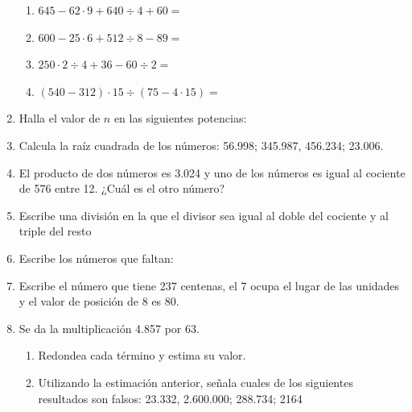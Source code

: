 \documentclass[twoside]{article}
\begin{document}
\begin{enumerate}
\begin{enumerate}
\item $645 - 62 \cdot 9 + 640 \div 4 + 60 =$
\item $600 - 25 \cdot 6 + 512 \div 8 - 89 =$
\item $250 \cdot 2 \div 4 + 36 - 60 \div 2 =$
\item $(540 - 312) \cdot 15 \div (75 - 4 \cdot 15)=$
\end{enumerate}
\item Halla el valor de $n$ en las siguientes potencias:
\begin{enumerate}
\end{enumerate}
\item Calcula la raíz cuadrada de los números: 56.998; 345.987, 456.234; 23.006.
\item El producto de dos números es 3.024 y uno de los números es igual al cociente de 576 entre 12. ¿Cuál es el otro número?
\item Escribe una división en la que el divisor sea igual al doble del cociente y al triple del resto
\item Escribe los números que faltan:
\begin{enumerate}
\end{enumerate}
\item Escribe el número que tiene 237 centenas, el 7 ocupa el lugar de las unidades y el valor de posición de 8 es 80.
\item Se da la multiplicación 4.857 por 63.
\begin{enumerate}
\item Redondea cada término y estima su valor.
\item Utilizando la estimación anterior, señala cuales de los siguientes resultados son falsos: 23.332, 2.600.000; 288.734; 2164
\end{enumerate}
\end{enumerate}
\end{document}
